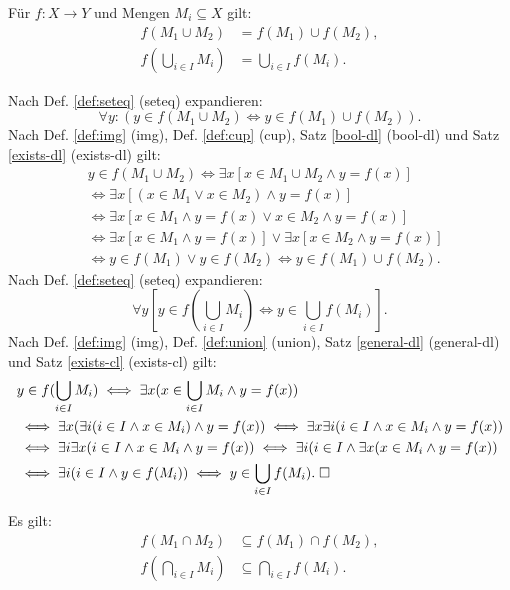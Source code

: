 \begin{Satz}
Für $f\colon X\to Y$ und Mengen $M_i\subseteq X$ gilt:
\begin{align}
f(M_1\cup M_2) &= f(M_1)\cup f(M_2),\\
f(\bigcup_{i\in I} M_i) &= \bigcup_{i\in I} f(M_i).
\end{align}
\end{Satz}
\begin{Beweis}
Nach Def. \ref{def:seteq} (seteq) expandieren:
\[\forall y\colon (y\in f(M_1\cup M_2)\iff y\in f(M_1)\cup f(M_2)).\]
Nach Def. \ref{def:img} (img), Def. \ref{def:cup} (cup),
Satz \ref{bool-dl} (bool-dl) und Satz \ref{exists-dl} (exists-dl) gilt:
\begin{align*}
&y\in f(M_1\cup M_2) \iff \exists x[x\in M_1\cup M_2\land y=f(x)]\\
&\iff \exists x[(x\in M_1\lor x\in M_2)\land y=f(x)]\\
&\iff \exists x[x\in M_1\land y=f(x)\lor x\in M_2\land y=f(x)]\\
&\iff \exists x[x\in M_1\land y=f(x)]\lor\exists x[x\in M_2\land y=f(x)]\\
&\iff y\in f(M_1)\lor y\in f(M_2) \iff y\in f(M_1)\cup f(M_2).
\end{align*}
Nach Def. \ref{def:seteq} (seteq) expandieren:
\[\forall y[y\in f(\bigcup_{i\in I} M_i)\iff y\in \bigcup_{i\in I} f(M_i)].\]
Nach Def. \ref{def:img} (img), Def. \ref{def:union} (union),
Satz \ref{general-dl} (general-dl)\\
und Satz \ref{exists-cl} (exists-cl) gilt:
\begin{align*}
& y\in f(\bigcup_{i\in I} M_i)
\iff \exists x(x\in\bigcup_{i\in I} M_i\land y=f(x))\\
&\iff \exists x(\exists i(i\in I\land x\in M_i)\land y=f(x))
\iff \exists x\exists i(i\in I\land x\in M_i\land y=f(x))\\
&\iff \exists i\exists x(i\in I\land x\in M_i\land y=f(x))
\iff \exists i(i\in I\land\exists x(x\in M_i\land y=f(x))\\
&\iff \exists i(i\in I\land y\in f(M_i))
\iff y\in\bigcup_{i\in I} f(M_i).\;\square
\end{align*}
\end{Beweis}

\begin{Satz}\label{img-cap-semi-dl}
Es gilt:
\begin{align}
f(M_1\cap M_2) &\subseteq f(M_1)\cap f(M_2),\\
f(\bigcap_{i\in I} M_i) &\subseteq \bigcap_{i\in I} f(M_i).
\end{align}
\end{Satz}

